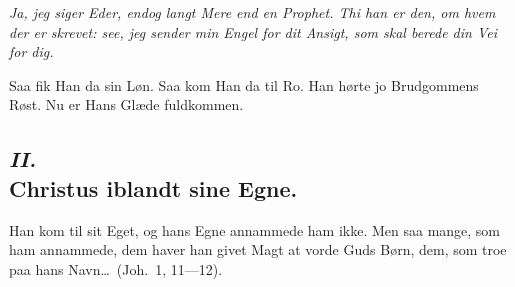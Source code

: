 \documentclass[12pt,a4paper]{book}
\begin{document}
\emph{Ja, jeg siger Eder, endog langt Mere end en Prophet. Thi han er den, om
hvem der er skrevet: see, jeg sender min Engel for dit Ansigt, som skal berede
din Vei for dig.}

Saa fik Han da sin Løn. Saa kom Han da til Ro. Han hørte jo Brudgommens Røst. Nu
er Hans Glæde fuldkommen.

%
%
%
\subsection*{\textit{II.}\\[4pt] Christus iblandt sine Egne.}

\begingroup\large
Han kom til sit Eget, og hans Egne annammede ham ikke. Men saa mange, som ham
annammede, dem haver han givet Magt at vorde Guds Børn, dem, som troe paa hans
Navn\dots\ (Joh.\ 1, 11---12).
\par\endgroup
\end{document}
